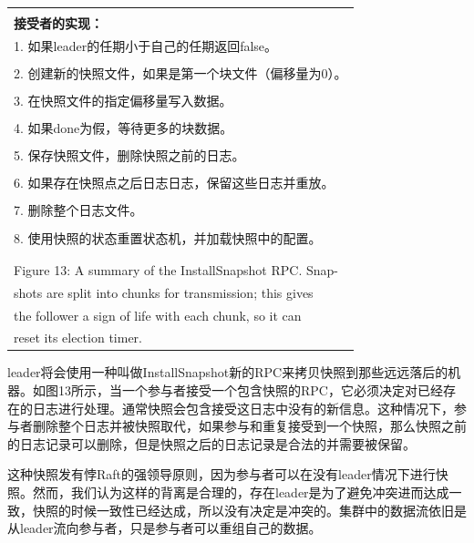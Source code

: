 \documentclass[journal]{IEEEtran}
\begin{document}
\begin{table}[htp]
\begin{center}
\begin{tabular}{|p{2.5cm}p{5.5cm}|}
&\\
\multicolumn{2}{|l|}{\textbf{接受者的实现：}} \\
\multicolumn{2}{|l|}{1. 如果leader的任期小于自己的任期返回false。} \\
&\\
\multicolumn{2}{|l|}{2. 创建新的快照文件，如果是第一个块文件（偏移量为0）。} \\
&\\
\multicolumn{2}{|l|}{3. 在快照文件的指定偏移量写入数据。}\\
&\\
\multicolumn{2}{|l|}{4. 如果done为假，等待更多的块数据。}\\
&\\
\multicolumn{2}{|l|}{5. 保存快照文件，删除快照之前的日志。}\\
&\\
\multicolumn{2}{|l|}{6. 如果存在快照点之后日志日志，保留这些日志并重放。}\\
&\\
\multicolumn{2}{|l|}{7. 删除整个日志文件。}\\
&\\
\multicolumn{2}{|l|}{8. 使用快照的状态重置状态机，并加载快照中的配置。}\\
&\\
\hline
\multicolumn{2}{l}{}\\
\multicolumn{2}{l}{Figure 13: A summary of the InstallSnapshot RPC. Snap-}\\
\multicolumn{2}{l}{\qquad \qquad shots are split into chunks for transmission; this gives}\\
\multicolumn{2}{l}{\qquad \qquad the follower a sign of life with each chunk, so it can} \\
\multicolumn{2}{l}{\qquad \qquad  reset its election timer.}\\
\end{tabular}
\end{center}
\label{default}
\end{table}%

leader将会使用一种叫做InstallSnapshot新的RPC来拷贝快照到那些远远落后的机器。如图13所示，当一个参与者接受一个包含快照的RPC，它必须决定对已经存在的日志进行处理。通常快照会包含接受这日志中没有的新信息。这种情况下，参与者删除整个日志并被快照取代，如果参与和重复接受到一个快照，那么快照之前的日志记录可以删除，但是快照之后的日志记录是合法的并需要被保留。

这种快照发有悖Raft的强领导原则，因为参与者可以在没有leader情况下进行快照。然而，我们认为这样的背离是合理的，存在leader是为了避免冲突进而达成一致，快照的时候一致性已经达成，所以没有决定是冲突的。集群中的数据流依旧是从leader流向参与者，只是参与者可以重组自己的数据。
\end{document}
